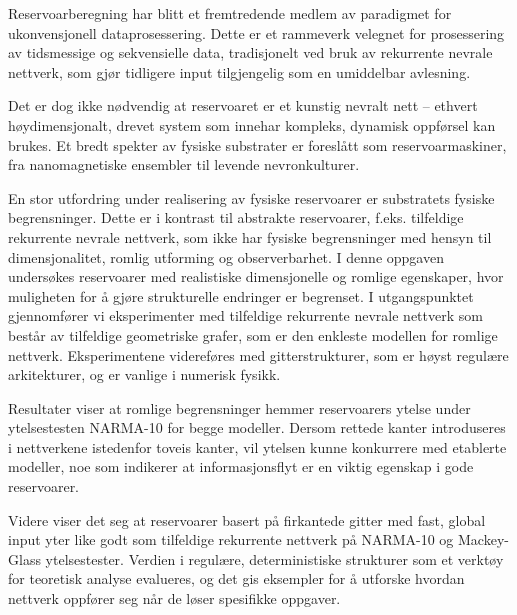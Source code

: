 Reservoarberegning har blitt et fremtredende medlem av paradigmet for
ukonvensjonell dataprosessering. Dette er et rammeverk velegnet for prosessering
av tidsmessige og sekvensielle data, tradisjonelt ved bruk av rekurrente nevrale
nettverk, som gjør tidligere input tilgjengelig som en umiddelbar avlesning.

Det er dog ikke nødvendig at reservoaret er et kunstig nevralt nett -- ethvert
høydimensjonalt, drevet system som innehar kompleks, dynamisk oppførsel kan
brukes. Et bredt spekter av fysiske substrater er foreslått som
reservoarmaskiner, fra nanomagnetiske ensembler til levende nevronkulturer.

En stor utfordring under realisering av fysiske reservoarer er substratets
fysiske begrensninger. Dette er i kontrast til abstrakte reservoarer,
f.eks. tilfeldige rekurrente nevrale nettverk, som ikke har fysiske
begrensninger med hensyn til dimensjonalitet, romlig utforming og
observerbarhet. I denne oppgaven undersøkes reservoarer med realistiske
dimensjonelle og romlige egenskaper, hvor muligheten for å gjøre strukturelle
endringer er begrenset. I utgangspunktet gjennomfører vi eksperimenter med
tilfeldige rekurrente nevrale nettverk som består av tilfeldige geometriske
grafer, som er den enkleste modellen for romlige nettverk. Eksperimentene
videreføres med gitterstrukturer, som er høyst regulære arkitekturer, og er
vanlige i numerisk fysikk.

Resultater viser at romlige begrensninger hemmer reservoarers ytelse under
ytelsestesten NARMA-10 for begge modeller. Dersom rettede kanter introduseres i
nettverkene istedenfor toveis kanter, vil ytelsen kunne konkurrere med etablerte
modeller, noe som indikerer at informasjonsflyt er en viktig egenskap i gode
reservoarer.

Videre viser det seg at reservoarer basert på firkantede gitter med fast, global
input yter like godt som tilfeldige rekurrente nettverk på NARMA-10 og
Mackey-Glass ytelsestester. Verdien i regulære, deterministiske strukturer som
et verktøy for teoretisk analyse evalueres, og det gis eksempler for å utforske
hvordan nettverk oppfører seg når de løser spesifikke oppgaver.

